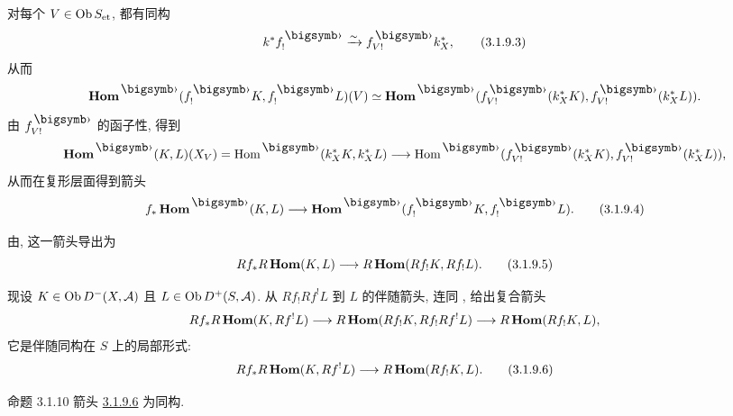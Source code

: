 对每个 $V\in \operatorname{Ob} S_{\text{\rm et}}$, 都有同构
\begin{equation*}
k^{\ast}f^{\bigdot}_{!}\xrightarrow{\sim}
f^{\bigdot}_{V!}k^{\ast}_{X}{\quoi},\tag{3.1.9.3}
\end{equation*}%
从而
\begin{equation*}
\Hhom^{\bigdot}(f^{\bigdot}_{!}K,f^{\bigdot}_{!}L)(V)\simeq
\Hhom^{\bigdot}(f^{\bigdot}_{V!}(k^{\ast}_{X}K),f^{\bigdot}_{V!}(k^{\ast}_{X}L)){\quoi}.
\end{equation*}%
由 $f^{\bigdot}_{V!}$ 的函子性, 得到
$$
\Hhom^{\bigdot}(K,L)(X_{V})=\Hom^{\bigdot}(k^{\ast}_{X}K,k^{\ast}_{X}L)\longrightarrow
\Hom^{\bigdot}(f^{\bigdot}_{V!}(k^{\ast}_{X}K),f^{\bigdot}_{V!}(k^{\ast}_{X}L)){\quoi},
$$
从而在复形层面得到箭头
\begin{equation*}
f_{\ast}\Hhom^{\bigdot}(K,L)\longrightarrow
\Hhom^{\bigdot}(f^{\bigdot}_{!}K,f^{\bigdot}_{!}L){\quoi}.\tag{3.1.9.4}
\end{equation*}

由\pageoriginale {}, 这一箭头导出为
\begin{equation*}
Rf_{\ast}R\operatorname{\mathbf{Hom}}(K,L)\longrightarrow
R\operatorname{\mathbf{Hom}}(Rf_{!}K,Rf_{!}L){}.\tag{3.1.9.5}
\end{equation*}

现设 $K\in \operatorname{Ob} D^{-}(X,\mathcal{A})$ 且 $L\in \operatorname{Ob}
D^{+}(S,\mathcal{A})$. 从 $Rf_{!}Rf^{!}L$ 到 $L$ 的伴随箭头, 连同 , 给出复合箭头
$$
Rf_{\ast}R\operatorname{\mathbf{Hom}}(K,Rf^{!}L)\longrightarrow R\operatorname{\mathbf{Hom}}(Rf_{!}K,
Rf_{!}Rf^{!}L)\longrightarrow R\operatorname{\mathbf{Hom}}(Rf_{!}K,L){},
$$
它是伴随同构在 $S$ 上的局部形式:
\begin{equation*}
Rf_{\ast}R\operatorname{\mathbf{Hom}}(K,Rf^{!}L)\longrightarrow
R\operatorname{\mathbf{Hom}}(Rf_{!}K,L){}.\tag{3.1.9.6}
\end{equation*}

\hypertarget{sga4.exp.XVIII.proposition.3.1.10}{}\begin{enonce*}{命题 3.1.10}
箭头 \hyperref[XVIII.eq3.1.9.6]{3.1.9.6} 为同构.
\end{enonce*}

